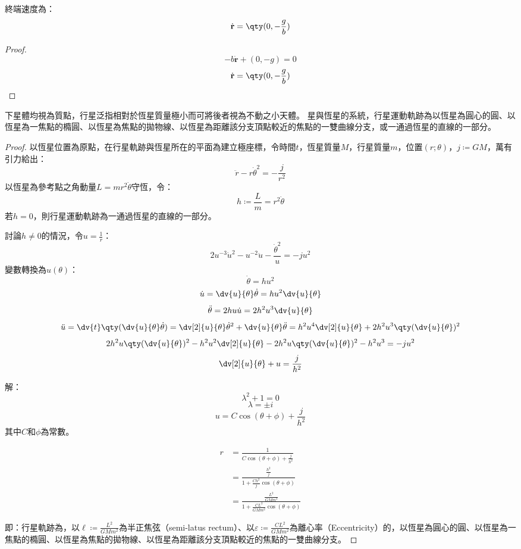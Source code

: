 \documentclass[a4paper,12pt]{article}
\begin{document}
終端速度為：
\[\dot{\mathbf{r}}=\qty(0,-\frac{g}{b})\]
\begin{proof}
\[-b\dot{\mathbf{r}}+(0,-g)=0\]
\[\dot{\mathbf{r}}=\qty(0,-\frac{g}{b})\]
\end{proof}
下星體均視為質點，行星泛指相對於恆星質量極小而可將後者視為不動之小天體。
星與恆星的系統，行星運動軌跡為以恆星為圓心的圓、以恆星為一焦點的橢圓、以恆星為焦點的拋物線、以恆星為距離該分支頂點較近的焦點的一雙曲線分支，或一通過恆星的直線的一部分。
\begin{proof}
以恆星位置為原點，在行星軌跡與恆星所在的平面為建立極座標，令時間$t$，恆星質量$M$，行星質量$m$，位置$(r;\theta)$，$j\coloneq GM$，萬有引力給出：
\[\ddot{r}-r\dot{\theta}^2=-\frac{j}{r^2}\]
以恆星為參考點之角動量$L=mr^2\dot{\theta}$守恆，令：
\[h\coloneq\frac{L}{m}=r^2\dot{\theta}\]
若$h=0$，則行星運動軌跡為一通過恆星的直線的一部分。

討論$h\neq0$的情況，令$u=\frac{1}{r}$：
\[2u^{-3}\dot{u}^2-u^{-2}\ddot{u}-\frac{\dot{\theta}^2}{u}=-ju^2\]
變數轉換為$u(\theta)$：
\[\dot{\theta}=h u^2\]
\[\dot{u}=\dv{u}{\theta}\dot{\theta}=h u^2\dv{u}{\theta}\]
\[\ddot{\theta}=2h u\dot{u}=2h^2u^3\dv{u}{\theta}\]
\[\ddot{u}=\dv{t}\qty(\dv{u}{\theta}\dot{\theta})=\dv[2]{u}{\theta}\dot{\theta}^2+\dv{u}{\theta}\ddot{\theta}=h^2u^4\dv[2]{u}{\theta}+2h^2u^3\qty(\dv{u}{\theta})^2\]
\[2h^2u\qty(\dv{u}{\theta})^2-h^2u^2\dv[2]{u}{\theta}-2h^2u\qty(\dv{u}{\theta})^2-h^2u^3=-ju^2\]
\[\dv[2]{u}{\theta}+u=\frac{j}{h^2}\]

解：
\[\lambda^2+1=0\]
\[\lambda=\pm i\]
\[u=C\cos(\theta+\phi)+\frac{j}{h^2}\]
其中$C$和$\phi$為常數。

\[\begin{aligned}
r&=\frac{1}{C\cos(\theta+\phi)+\frac{j}{h^2}}\\
&=\frac{\frac{h^2}{j}}{1+\frac{Ch^2}{j}\cos(\theta+\phi)}\\
&=\frac{\frac{L^2}{GMm^2}}{1+\frac{CL^2}{GMm^2}\cos(\theta+\phi)}
\end{aligned}\]

即：行星軌跡為，以$\ell\coloneq \frac{L^2}{GMm^2}$為半正焦弦（semi-latus rectum）、以$\varepsilon\coloneq \frac{CL^2}{GMm^2}$為離心率（Eccentricity）的，以恆星為圓心的圓、以恆星為一焦點的橢圓、以恆星為焦點的拋物線、以恆星為距離該分支頂點較近的焦點的一雙曲線分支。
\end{proof}
\end{document}
